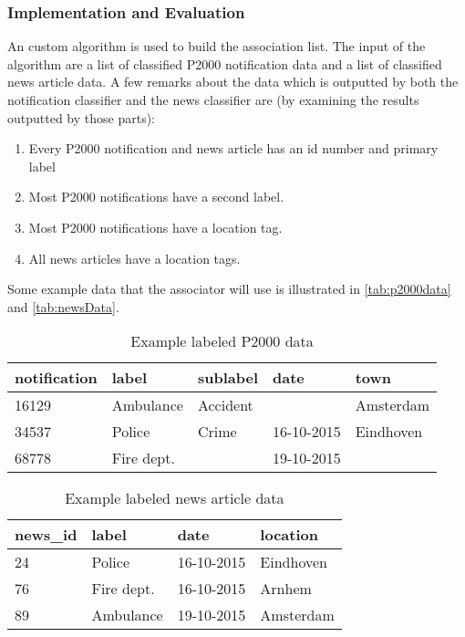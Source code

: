 \subsubsection*{Implementation and Evaluation }
An custom algorithm is used to build the association list. The input of the algorithm are a list of classified P2000 notification data and a list of classified news article data. A few remarks about the data which is outputted by both the notification classifier and the news classifier are (by examining the results outputted by those parts):
\begin{enumerate}
\item Every P2000 notification and news article has an id number and primary label
\item Most P2000 notifications have a second label. 
\item Most P2000 notifications have a location tag.
\item All news articles have a location tags.
\end{enumerate}

Some example data that the associator will use is illustrated in \autoref{tab:p2000data} and \autoref{tab:newsData}. 
\begin{table}[]
\centering
\begin{tabular}{|l|l|l|l|l|}
\hline
\textbf{notification} & \textbf{label} & \textbf{sublabel} & \textbf{date} & \textbf{town} \\ \hline
16129                 & Ambulance      & Accident          &               & Amsterdam     \\ \hline
34537                 & Police         & Crime             & 16-10-2015    & Eindhoven     \\ \hline
68778                 & Fire dept.     &                   & 19-10-2015    &               \\ \hline
\end{tabular}
\caption{Example labeled P2000 data}
\label{tab:p2000data}
\end{table}

\begin{table}[]
\centering
\begin{tabular}{|l|l|l|l|}
\hline
\textbf{news\_id} & \textbf{label} & \textbf{date} & \textbf{location} \\ \hline
24                & Police         &  16-10-2015             & Eindhoven         \\ \hline
76                & Fire dept.     & 16-10-2015    & Arnhem         \\ \hline
89                & Ambulance      & 19-10-2015    & Amsterdam            \\ \hline
\end{tabular}
\caption{Example labeled news article data}
\label{tab:newsData}
\end{table}

